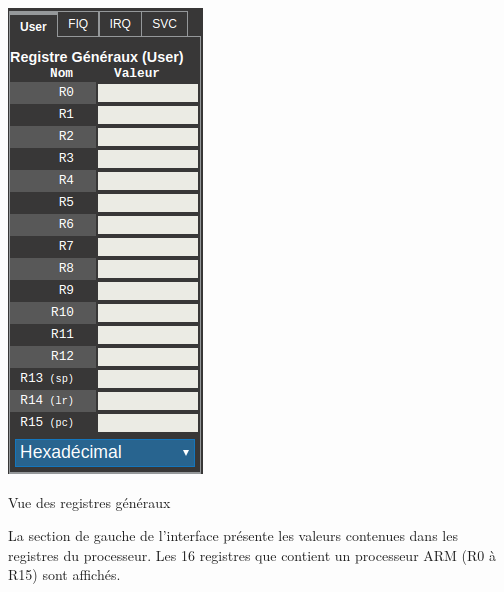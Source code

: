 \documentclass{tufte-handout}
\begin{document}
\begin{marginfigure}
\includegraphics[width=0.8\linewidth]{pics/registres.png}
\label{f:registres}
\caption{Vue des registres généraux}
\end{marginfigure}
La section de gauche de l'interface présente les valeurs contenues dans les registres du processeur.
Les 16 registres que contient un processeur ARM (R0 à R15) sont affichés. 
\end{document}
